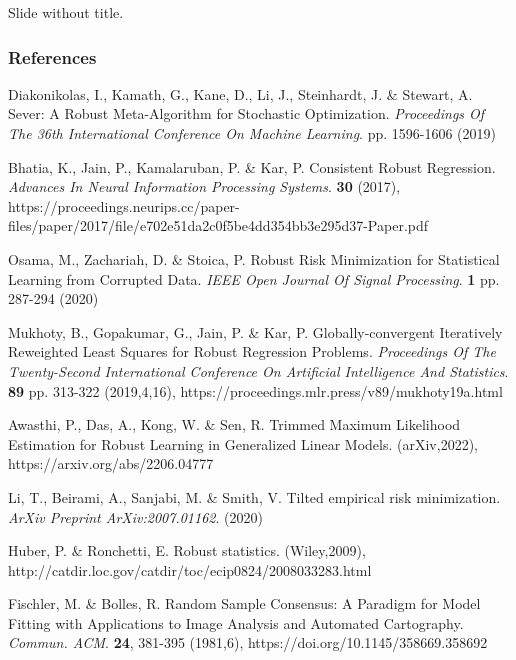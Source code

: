 \documentclass[
11pt, %
serif
]{beamer}
\begin{document}
	
	\begin{frame}
		Slide without title.
	\end{frame}
	
	
	\begin{frame} %
		\frametitle{References}
		
		\begin{thebibliography}{99} %
			\footnotesize %
			
			Diakonikolas, I., Kamath, G., Kane, D., Li, J., Steinhardt, J. \& Stewart, A. Sever: A Robust Meta-Algorithm for Stochastic Optimization. {\em Proceedings Of The 36th International Conference On Machine Learning}. pp. 1596-1606 (2019)
			
			Bhatia, K., Jain, P., Kamalaruban, P. \& Kar, P. Consistent Robust Regression. {\em Advances In Neural Information Processing Systems}. \textbf{30} (2017), https://proceedings.neurips.cc/paper-files/paper/2017/file/e702e51da2c0f5be4dd354bb3e295d37-Paper.pdf
			
			Osama, M., Zachariah, D. \& Stoica, P. Robust Risk Minimization for Statistical Learning from Corrupted Data. {\em  IEEE Open Journal Of Signal Processing}. \textbf{1} pp. 287-294 (2020)
			
			Mukhoty, B., Gopakumar, G., Jain, P. \& Kar, P. Globally-convergent Iteratively Reweighted Least Squares for Robust Regression Problems. {\em Proceedings Of The Twenty-Second International Conference On Artificial Intelligence And Statistics}. \textbf{89} pp. 313-322 (2019,4,16), https://proceedings.mlr.press/v89/mukhoty19a.html
						
			Awasthi, P., Das, A., Kong, W. \& Sen, R. Trimmed Maximum Likelihood Estimation for Robust Learning in Generalized Linear Models. (arXiv,2022), https://arxiv.org/abs/2206.04777
						
			Li, T., Beirami, A., Sanjabi, M. \& Smith, V. Tilted empirical risk minimization. {\em ArXiv Preprint ArXiv:2007.01162}. (2020)
			
			Huber, P. \& Ronchetti, E. Robust statistics. (Wiley,2009), http://catdir.loc.gov/catdir/toc/ecip0824/2008033283.html
			
			Fischler, M. \& Bolles, R. Random Sample Consensus: A Paradigm for Model Fitting with Applications to Image Analysis and Automated Cartography. {\em Commun. ACM}. \textbf{24}, 381-395 (1981,6), https://doi.org/10.1145/358669.358692
			
		\end{thebibliography}
	\end{frame}
	
\end{document}
